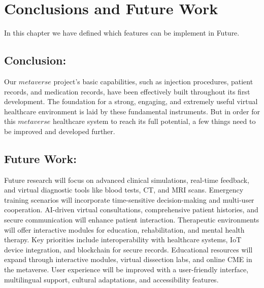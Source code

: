 \chapter{Conclusions and Future Work}
In this chapter we have defined which features can be implement in Future.
\section{Conclusion:}
Our $metaverse$ project's basic capabilities, such as injection procedures, patient records, and medication records, have been effectively built throughout its first development. The foundation for a strong, engaging, and extremely useful virtual healthcare environment is laid by these fundamental instruments. But in order for this $metaverse$ healthcare system to reach its full potential, a few things need to be improved and developed further.
\section{Future Work:}
Future research will focus on advanced clinical simulations, real-time feedback, and virtual diagnostic tools like blood tests, CT, and MRI scans. Emergency training scenarios will incorporate time-sensitive decision-making and multi-user cooperation. AI-driven virtual consultations, comprehensive patient histories, and secure communication will enhance patient interaction. Therapeutic environments will offer interactive modules for education, rehabilitation, and mental health therapy. Key priorities include interoperability with healthcare systems, IoT device integration, and blockchain for secure records. Educational resources will expand through interactive modules, virtual dissection labs, and online CME in the metaverse. User experience will be improved with a user-friendly interface, multilingual support, cultural adaptations, and accessibility features.